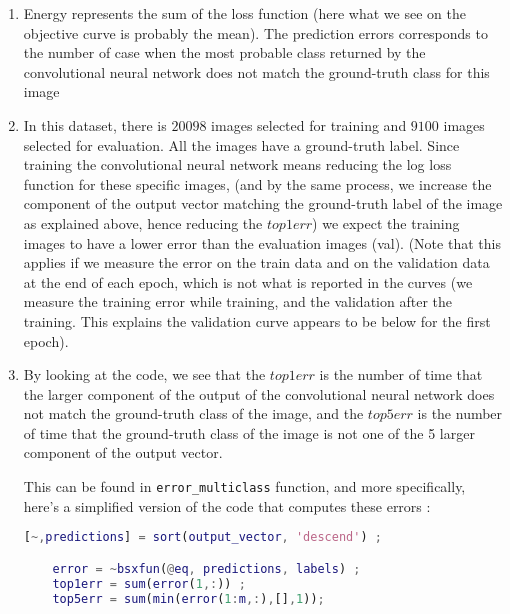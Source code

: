 \documentclass{article}
\begin{document}
\begin{enumerate}
\item Energy represents the sum of the loss function (here what we see
  on the objective curve is probably the mean). The prediction errors
  corresponds to the number of case when the most probable class
  returned by the convolutional neural network does not match the
  ground-truth class for this image


\item In this dataset, there is $20098$ images selected for training
  and $9100$ images selected for evaluation. All the images have a
  ground-truth label. Since training the convolutional neural network
  means reducing the log loss function for these specific images, (and
  by the same process, we increase the component of the output vector
  matching the ground-truth label of the image as explained above,
  hence reducing the $top1err$) we expect the training images to have
  a lower error than the evaluation images (val). (Note that this
  applies if we measure the error on the train data and on the
  validation data at the end of each epoch, which is not what is
  reported in the curves (we measure the training error while
  training, and the validation after the training. This explains
  the validation curve appears to be below for the first epoch).

\item By looking at the code, we see that the $top1err$ is the number
  of time that the larger component of the output of the convolutional
  neural network does not match the ground-truth class of the image,
  and the $top5err$ is the number of time that the ground-truth class
  of the image is not one of the 5 larger component of the output
  vector.

  This can be found in \verb+error_multiclass+ function, and more
  specifically, here's a simplified version of the code that
  computes these errors :
  \begin{lstlisting}[language=Matlab]
    [~,predictions] = sort(output_vector, 'descend') ;

    error = ~bsxfun(@eq, predictions, labels) ;
    top1err = sum(error(1,:)) ;
    top5err = sum(min(error(1:m,:),[],1));\end{lstlisting}

\end{enumerate}
\end{document}
